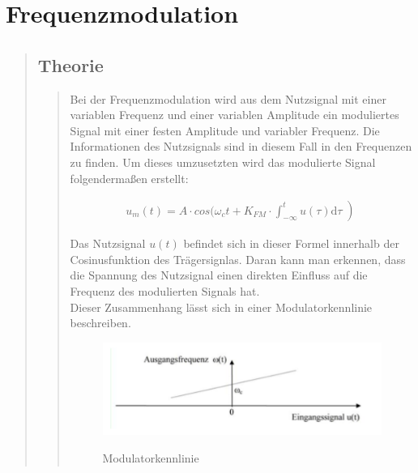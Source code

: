 \section{Frequenzmodulation}
\begin{quote}
    \subsection{Theorie}
    \begin{quote}
    
    	Bei der Frequenzmodulation wird aus dem
    	Nutzsignal mit einer variablen Frequenz und einer variablen Amplitude ein
    	moduliertes Signal mit einer festen Amplitude und variabler Frequenz. Die
    	Informationen des Nutzsignals sind in diesem Fall in den Frequenzen zu
    	finden. Um dieses umzusetzten wird das modulierte Signal folgendermaßen
    	erstellt:
        
        \begin{equation*}
        	\begin{split}
        		u_m (t) = A \cdot cos ( \omega_c t + K_{FM} \cdot \int_{-\infty}^{t} u(\tau) \mathrm d\tau \left)
        	\end{split}
        \end{equation*}
        
        Das Nutzsignal $u(t)$ befindet sich in dieser Formel innerhalb der Cosinusfunktion des Trägersignlas. Daran
        kann man erkennen, dass die Spannung des Nutzsignal einen direkten Einfluss auf die Frequenz des modulierten
        Signals hat.\\
        Dieser Zusammenhang lässt sich  in einer Modulatorkennlinie beschreiben.
        
        \begin{figure}[H]
        \centering
            \includegraphics[scale=0.7, trim = 0cm 0cm 0cm 0cm, clip]{./Bilder/Modulatorkennlinie}
                \caption{Modulatorkennlinie}
                \cite{Modulatorkennlinie}
        \end{figure}
    

\end{quote}
\end{quote}
